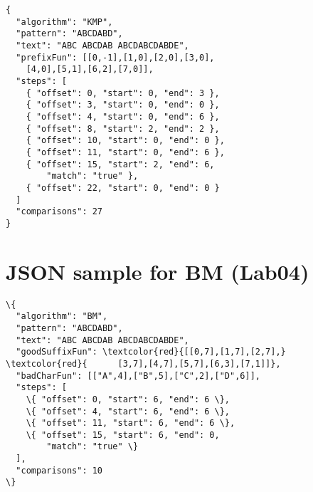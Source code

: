 \documentclass[jou]{apa6}
\begin{document}
\begin{verbatim}
{
  "algorithm": "KMP",
  "pattern": "ABCDABD",
  "text": "ABC ABCDAB ABCDABCDABDE",
  "prefixFun": [[0,-1],[1,0],[2,0],[3,0],
    [4,0],[5,1],[6,2],[7,0]],
  "steps": [
    { "offset": 0, "start": 0, "end": 3 },
    { "offset": 3, "start": 0, "end": 0 },
    { "offset": 4, "start": 0, "end": 6 },
    { "offset": 8, "start": 2, "end": 2 },
    { "offset": 10, "start": 0, "end": 0 },
    { "offset": 11, "start": 0, "end": 6 },
    { "offset": 15, "start": 2, "end": 6, 
	    "match": "true" },   
    { "offset": 22, "start": 0, "end": 0 }
  ]
  "comparisons": 27
}
\end{verbatim}

\section{JSON sample for BM (Lab04)}


\begin{Verbatim}[commandchars=\\\{\}]
\{
  "algorithm": "BM",
  "pattern": "ABCDABD",
  "text": "ABC ABCDAB ABCDABCDABDE",
  "goodSuffixFun": \textcolor{red}{[[0,7],[1,7],[2,7],}
\textcolor{red}{      [3,7],[4,7],[5,7],[6,3],[7,1]]},
  "badCharFun": [["A",4],["B",5],["C",2],["D",6]],	
  "steps": [ 
    \{ "offset": 0, "start": 6, "end": 6 \},
    \{ "offset": 4, "start": 6, "end": 6 \},
    \{ "offset": 11, "start": 6, "end": 6 \},
    \{ "offset": 15, "start": 6, "end": 0, 
        "match": "true" \}    
  ],
  "comparisons": 10
\}
\end{Verbatim}
\end{document}
